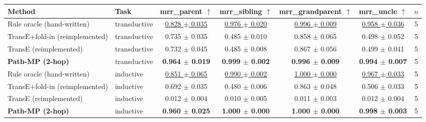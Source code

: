 \begin{tabular}{llccccc}
\toprule
Method & Task & mrr\_parent $\uparrow$ & mrr\_sibling $\uparrow$ & mrr\_grandparent $\uparrow$ & mrr\_uncle $\uparrow$ & $n$ \\
\midrule
Rule oracle (hand-written) & transductive & \underline{0.828 $\pm$ 0.035} & \underline{0.976 $\pm$ 0.020} & \underline{0.996 $\pm$ 0.009} & \underline{0.958 $\pm$ 0.036} & 5 \\
TransE+fold-in (reimplemented) & transductive & 0.735 $\pm$ 0.035 & 0.485 $\pm$ 0.010 & 0.858 $\pm$ 0.065 & 0.498 $\pm$ 0.052 & 5 \\
TransE (reimplemented) & transductive & 0.732 $\pm$ 0.045 & 0.485 $\pm$ 0.008 & 0.867 $\pm$ 0.056 & 0.499 $\pm$ 0.041 & 5 \\
\textbf{Path-MP (2-hop)} & transductive & \textbf{0.964 $\pm$ 0.019} & \textbf{0.999 $\pm$ 0.002} & \textbf{0.996 $\pm$ 0.009} & \textbf{0.994 $\pm$ 0.007} & 5 \\
\midrule
Rule oracle (hand-written) & inductive & \underline{0.851 $\pm$ 0.065} & \underline{0.990 $\pm$ 0.002} & \underline{1.000 $\pm$ 0.000} & \underline{0.967 $\pm$ 0.033} & 5 \\
TransE+fold-in (reimplemented) & inductive & 0.692 $\pm$ 0.035 & 0.480 $\pm$ 0.006 & 0.863 $\pm$ 0.048 & 0.506 $\pm$ 0.033 & 5 \\
TransE (reimplemented) & inductive & 0.012 $\pm$ 0.004 & 0.010 $\pm$ 0.005 & 0.011 $\pm$ 0.003 & 0.012 $\pm$ 0.004 & 5 \\
\textbf{Path-MP (2-hop)} & inductive & \textbf{0.960 $\pm$ 0.025} & \textbf{1.000 $\pm$ 0.000} & \textbf{1.000 $\pm$ 0.000} & \textbf{0.998 $\pm$ 0.003} & 5 \\
\bottomrule
\end{tabular}
